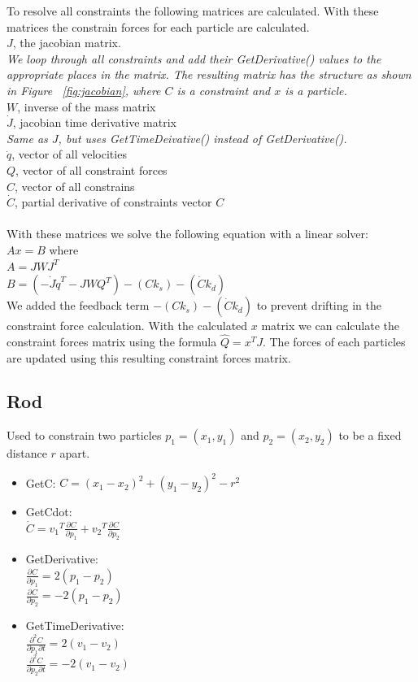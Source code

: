 \noindent To resolve all constraints the following matrices are calculated.
With these matrices the constrain forces for each particle are calculated.\\
$J$, the jacobian matrix.\\
\emph{We loop through all constraints and add their GetDerivative() values to the appropriate places in the matrix.
The resulting matrix has the structure as shown in Figure ~\ref{fig:jacobian}, where $C$ is a constraint and $x$ is a particle.}\\
$W$, inverse of the mass matrix\\
$\dot{J}$, jacobian time derivative matrix\\
\emph{Same as $J$, but uses GetTimeDeivative() instead of GetDerivative().}\\
$\dot{q}$, vector of all velocities\\
$Q$, vector of all constraint forces\\
$C$, vector of all constrains\\
$\dot{C}$, partial derivative of constraints vector $C$\\
\\
With these matrices we solve the following equation with a linear solver:\\
$Ax = B$ where\\
$A = J W J^{T}$\\
$B = (-\dot{J} \dot{q}^{T} - J W Q^{T}) - (C k_s) - (\dot{C} k_d)$\\
We added the feedback term $- (C k_s) - (\dot{C} k_d)$ to prevent drifting in the constraint force calculation.
With the calculated $x$ matrix we can calculate the constraint forces matrix using the formula $\hat{Q} = x^{T} J$.
The forces of each particles are updated using this resulting constraint forces matrix.\\

\subsection{Rod}
Used to constrain two particles $p_1 = (x_1,y_1)$ and $p_2 = (x_2,y_2)$ to be a fixed distance $r$ apart.
\begin{itemize}
  \item GetC: $C = (x_1 - x_2)^2 + (y_1 - y_2)^2 - r^2$
  \item GetCdot:\\
    $\dot{C} = {v_1}^T \frac{\partial C}{\partial p_1} + {v_2}^T \frac{\partial C}{\partial p_2}$
  \item GetDerivative:\\
    $\frac{\partial C}{\partial p_1} = 2 (p_1 - p_2)$\\
    $\frac{\partial C}{\partial p_2} = -2 (p_1 - p_2)$
  \item GetTimeDerivative:\\
    $\frac{\partial^2 C}{\partial p_1 \partial t} = 2 (v_1 - v_2)$\\
    $\frac{\partial^2 C}{\partial p_2 \partial t} = -2 (v_1 - v_2)$
\end{itemize}

